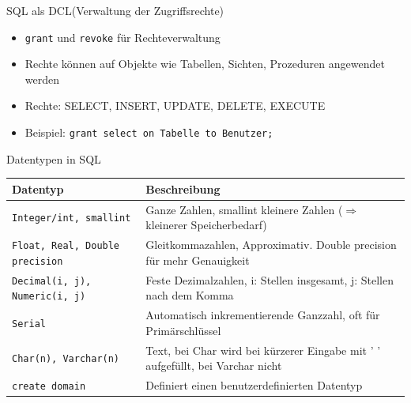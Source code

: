 \documentclass{article}
\begin{document}
\begin{block}{SQL als DCL(Verwaltung der Zugriffsrechte)}
  \begin{itemize}
    \item \texttt{grant} und \texttt{revoke} für Rechteverwaltung
    \item Rechte können auf Objekte wie Tabellen, Sichten, Prozeduren angewendet werden
    \item Rechte: SELECT, INSERT, UPDATE, DELETE, EXECUTE
    \item Beispiel: \texttt{grant select on Tabelle to Benutzer;}
  \end{itemize}
\end{block}

\begin{block}{Datentypen in SQL}
  \begin{center}
    \begin{tabular}{|p{4cm}|p{7cm}|}
      \hline
      \textbf{Datentyp} & \textbf{Beschreibung} \\
      \hline
      \texttt{Integer/int, smallint} & Ganze Zahlen, smallint kleinere Zahlen ($\Rightarrow$ kleinerer Speicherbedarf) \\
      \hline
      \texttt{Float, Real, Double precision} & Gleitkommazahlen, Approximativ. Double precision für mehr Genauigkeit \\
      \hline
      \texttt{Decimal(i, j), Numeric(i, j)} & Feste Dezimalzahlen, i: Stellen insgesamt, j: Stellen nach dem Komma \\
      \hline
      \texttt{Serial} & Automatisch inkrementierende Ganzzahl, oft für Primärschlüssel \\
      \hline
      \texttt{Char(n), Varchar(n)} & Text, bei Char wird bei kürzerer Eingabe mit ' ' aufgefüllt, bei Varchar nicht \\
      \hline
      \texttt{create domain} & Definiert einen benutzerdefinierten Datentyp \\
      \hline
    \end{tabular}
  \end{center}
\end{block}
\end{document}
